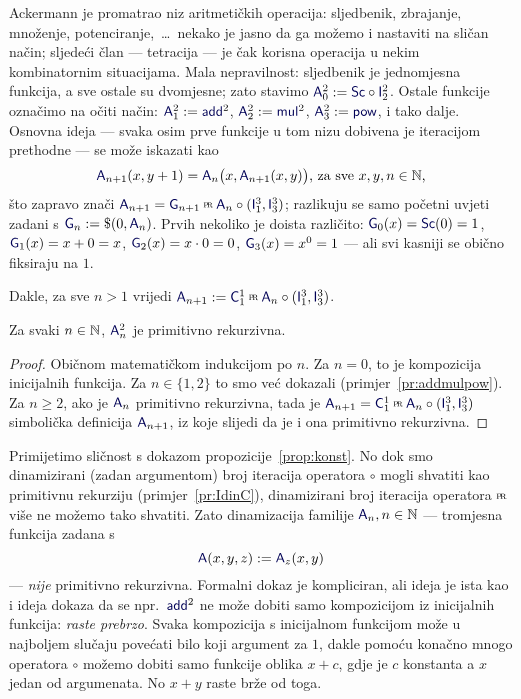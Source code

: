 Ackermann je promatrao niz aritmetičkih operacija: sljedbenik, zbrajanje, množenje, potenciranje,~\ldots\ nekako je jasno da ga možemo i nastaviti na sličan način; sljedeći član --- tetracija --- je čak korisna operacija u nekim kombinatornim situacijama. Mala nepravilnost: sljedbenik je jednomjesna funkcija, a sve ostale su dvomjesne; zato stavimo $\f A_0^2:=\f{Sc}\circ \f I_2^2$. Ostale funkcije označimo na očiti način: $\f A_1^2:=\f{add}^2$, $\f A_2^2:=\f{mul}^2$, $\f A_3^2:=\f{pow}$, i tako dalje. Osnovna ideja --- svaka osim prve funkcije u tom nizu dobivena je iteracijom prethodne --- se može iskazati kao
\begin{equation}\label{eq:A2SSdef}
    \f A_{n+1}(x,y+1)=\f A_n\bigl(x,\f A_{n+1}(x,y)\bigr)\text{, za sve }x,y,n\in\N\text,
\end{equation}
što zapravo znači $\f A_{n+1}=\f G_{n+1}\pr\f A_n\circ(\f I_1^3,\f I_3^3)$; razlikuju se samo početni uvjeti zadani s $\f G_n:=\$(0,\f A_n)$. Prvih nekoliko je doista različito: $\f G_0(x)=\f{Sc}(0)=1$, $\f G_1(x)=x+0=x$, $\f G_2(x)=x\cdot 0=0$, $\f G_3(x)=x^0=1$ --- ali svi kasniji se obično fiksiraju na $1$.

Dakle, za sve $n>1$ vrijedi $\f A_{n+1}:=\f C_1^1\pr\f A_n\circ(\f I_1^3,\f I_3^3)$.

\begin{propozicija}[{name=[primitivna rekurzivnost generaliziranih aritmetičkih operacija]}]\label{pp:Anprn}
    Za svaki $n\in{\mathbb N}$, $\f A_n^2$ je primitivno rekurzivna.
\end{propozicija}
\begin{proof}
Običnom matematičkom indukcijom po $n$. Za $n=0$, to je kompozicija inicijalnih funkcija. Za $n\in\{1,2\}$ to smo već dokazali (primjer~\ref{pr:addmulpow}). Za $n\ge 2$, ako je $\f A_n$ primitivno rekurzivna, tada je $\f A_{n+1}=\f C_1^1\pr\f A_n\circ(\f I_1^3,\f I_3^3)$ simbolička definicija $\f A_{n+1}$, iz koje slijedi da je i ona primitivno rekurzivna.
\end{proof}

Primijetimo sličnost s dokazom propozicije~\ref{prop:konst}. No dok smo dinamizirani (zadan argumentom) broj iteracija operatora $\circ$ mogli shvatiti kao primitivnu rekurziju (primjer~\ref{pr:IdinC}), dinamizirani broj iteracija operatora $\pr$ više ne možemo tako shvatiti. Zato dinamizacija familije $\f A_n,n\in\N$ --- tromjesna funkcija zadana s
\begin{equation}
    \f A(x,y,z):=\f A_z(x,y)%
\end{equation}
{} --- \emph{nije} primitivno rekurzivna. Formalni dokaz je kompliciran, ali ideja je ista kao i ideja dokaza da se npr.\ $\f{add}^2$ ne može dobiti samo kompozicijom iz inicijalnih funkcija: \emph{raste prebrzo}. Svaka kompozicija s inicijalnom funkcijom može u najboljem slučaju povećati bilo koji argument za $1$, dakle pomoću konačno mnogo operatora $\circ$ možemo dobiti samo funkcije oblika $x+c$, gdje je $c$ konstanta a $x$ jedan od argumenata. No $x+y$ raste brže od toga.

